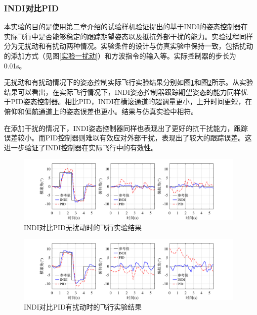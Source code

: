 \subsubsection{INDI对比PID}

本实验的目的是使用第二章介绍的试验样机验证提出的基于INDI的姿态控制器在实际飞行中是否能够稳定的跟踪期望姿态以及抵抗外部干扰的能力。实验过程同样分为无扰动和有扰动两种情况。实验条件的设计与仿真实验中保持一致，包括扰动的添加方式（见图\ref{实验一扰动}）和方波指令的输入等。实际控制器的步长为0.01s。

无扰动和有扰动情况下的姿态控制实际飞行实验结果分别如图\ref{INDI对比PID无扰动飞行实验结果}和图\ref{INDI对比PID有扰动飞行实验结果}所示。从实验结果可以看出，在实际飞行情况下，INDI姿态控制器跟踪期望姿态的能力同样优于PID姿态控制器。相比PID，INDI在横滚通道的超调量更小，上升时间更短，在俯仰和偏航通道上的姿态误差也更小。结果与仿真实验中相符。

在添加干扰的情况下，INDI姿态控制器同样也表现出了更好的抗干扰能力，跟踪误差较小。而PID控制器则难以有效应对外部干扰，表现出了较大的跟踪误差。这进一步验证了INDI控制器在实际飞行中的有效性。
\begin{figure}[htbp]
	\centering
	\begin{minipage}[c]{1\textwidth}
        \centering
        \includegraphics[scale=1]{Fig/INDI对比PID无扰动飞行实验结果.pdf}
        \caption{\label{INDI对比PID无扰动飞行实验结果}INDI对比PID无扰动时的飞行实验结果}
        \end{minipage}
\end{figure}
\begin{figure}[htbp]
	\centering
	\begin{minipage}[c]{1\textwidth}
        \centering
        \includegraphics[scale=1]{Fig/INDI对比PID有扰动飞行实验结果.pdf}
        \caption{\label{INDI对比PID有扰动飞行实验结果}INDI对比PID有扰动时的飞行实验结果}
        \end{minipage}
\end{figure}

